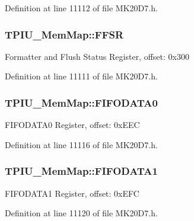 Definition at line 11112 of file M\+K20\+D7.\+h.

\subsubsection[{\texorpdfstring{F\+F\+SR}{FFSR}}]{ T\+P\+I\+U\+\_\+\+Mem\+Map\+::\+F\+F\+SR}\hypertarget{struct_t_p_i_u___mem_map_ada0d6c32bb6a91e5edfcbbe7f37e6fd6}{}\label{struct_t_p_i_u___mem_map_ada0d6c32bb6a91e5edfcbbe7f37e6fd6}
Formatter and Flush Status Register, offset\+: 0x300 

Definition at line 11111 of file M\+K20\+D7.\+h.

\subsubsection[{\texorpdfstring{F\+I\+F\+O\+D\+A\+T\+A0}{FIFODATA0}}]{ T\+P\+I\+U\+\_\+\+Mem\+Map\+::\+F\+I\+F\+O\+D\+A\+T\+A0}\hypertarget{struct_t_p_i_u___mem_map_abb1cb9e6415fb7a020856a400197b7bf}{}\label{struct_t_p_i_u___mem_map_abb1cb9e6415fb7a020856a400197b7bf}
F\+I\+F\+O\+D\+A\+T\+A0 Register, offset\+: 0x\+E\+EC 

Definition at line 11116 of file M\+K20\+D7.\+h.

\subsubsection[{\texorpdfstring{F\+I\+F\+O\+D\+A\+T\+A1}{FIFODATA1}}]{ T\+P\+I\+U\+\_\+\+Mem\+Map\+::\+F\+I\+F\+O\+D\+A\+T\+A1}\hypertarget{struct_t_p_i_u___mem_map_a49b8e093cff84e13fc33a98587395a39}{}\label{struct_t_p_i_u___mem_map_a49b8e093cff84e13fc33a98587395a39}
F\+I\+F\+O\+D\+A\+T\+A1 Register, offset\+: 0x\+E\+FC 

Definition at line 11120 of file M\+K20\+D7.\+h.

